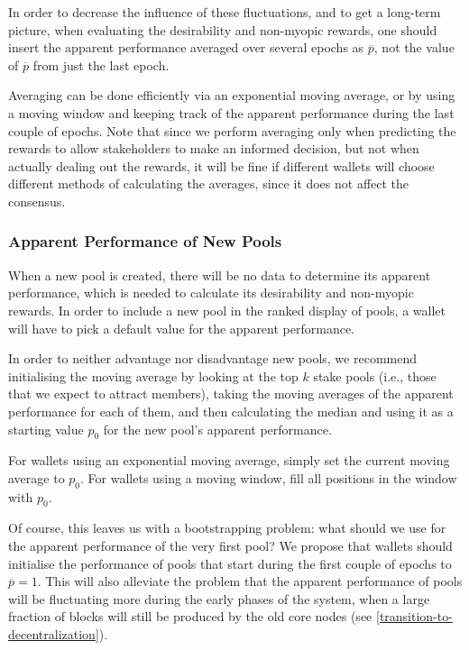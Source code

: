 \documentclass[11pt,a4paper,dvipsnames,twosided]{article}
\newcommand\pbar{\overline{p}}
\begin{document}
In order to decrease the influence of these fluctuations, and to get a long-term
picture, when evaluating the desirability and non-myopic rewards, one should
insert the apparent performance averaged over several epochs as \(\pbar\), not
the value of \(\pbar\) from just the last epoch.

Averaging can be done efficiently via an exponential moving average, or by using
a moving window and keeping track of the apparent performance during the last
couple of epochs. Note that since we perform averaging only when predicting the
rewards to allow stakeholders to make an informed decision, but not when
actually dealing out the rewards, it will be fine if different wallets will
choose different methods of calculating the averages, since it does not affect
the consensus.

\subsubsection{Apparent Performance of New Pools}
\label{apparent-performance-of-new-pools}

When a new pool is created, there will be no data to determine its apparent
performance, which is needed to calculate its desirability and non-myopic
rewards. In order to include a new pool in the ranked display of pools, a wallet
will have to pick a default value for the apparent performance.

In order to neither advantage nor disadvantage new pools, we recommend
initialising the moving average by looking at the top \(k\) stake pools (i.e.,
those that we expect to attract members), taking the moving averages of the
apparent performance for each of them, and then calculating the median and
using it as a starting value \(p_0\) for the new pool's apparent performance.

For wallets using an exponential moving average, simply set the current moving
average to \(p_0\). For wallets using a moving window, fill all positions in the
window with \(p_0\).

Of course, this leaves us with a bootstrapping problem: what should we use for
the apparent performance of the very first pool? We propose that wallets should
initialise the performance of pools that start during the first couple of epochs
to \(\pbar=1\). This will also alleviate the problem that the apparent
performance of pools will be fluctuating more during the early phases of the
system, when a large fraction of blocks will still be produced by the old core
nodes (see \cref{transition-to-decentralization}).
\end{document}
